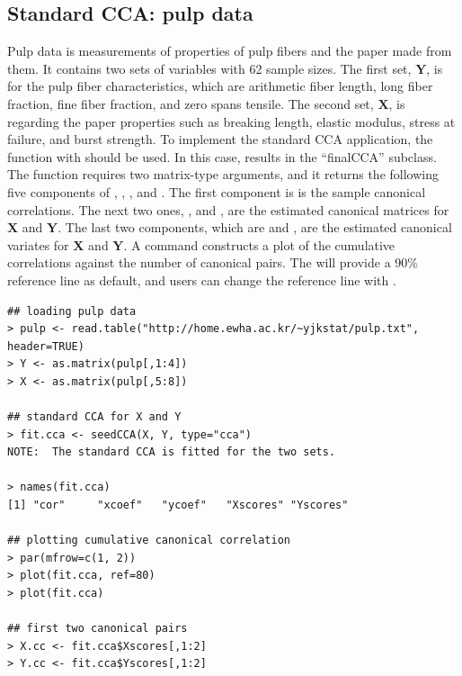\subsection{Standard CCA: pulp data}
Pulp data is measurements of properties of
pulp fibers and the paper made from them.
It contains two sets of variables with 62 sample sizes.
The first set, $\mathbf{Y}$, is for the pulp fiber characteristics,
which are arithmetic fiber length, long fiber fraction,
fine fiber fraction, and zero spans tensile.
The second set, $\mathbf{X}$, is regarding the paper properties such as
breaking length, elastic modulus, stress at failure, and burst strength.
To implement the standard CCA application,
the function   with  should be used.
In this case,  results in the ``finalCCA'' subclass.
The function requires two matrix-type arguments, and
it returns the following five components of
, , ,  and .
The first component is  is the sample canonical correlations.
The next two ones, , and , are
the estimated canonical matrices for $\mathbf{X}$ and $\mathbf{Y}$.
The last two components, which are  and ,
are the estimated canonical variates for $\mathbf{X}$ and $\mathbf{Y}$.
A command   constructs a plot of the cumulative correlations
against the number of canonical pairs.
The  will provide a 90\% reference line as default, and
users can  change the reference line with .
%
\begin{verbatim}
## loading pulp data
> pulp <- read.table("http://home.ewha.ac.kr/~yjkstat/pulp.txt", header=TRUE)
> Y <- as.matrix(pulp[,1:4])
> X <- as.matrix(pulp[,5:8])

## standard CCA for X and Y
> fit.cca <- seedCCA(X, Y, type="cca")
NOTE:  The standard CCA is fitted for the two sets.

> names(fit.cca)
[1] "cor"     "xcoef"   "ycoef"   "Xscores" "Yscores"

## plotting cumulative canonical correlation
> par(mfrow=c(1, 2))
> plot(fit.cca, ref=80)
> plot(fit.cca)

## first two canonical pairs
> X.cc <- fit.cca$Xscores[,1:2]
> Y.cc <- fit.cca$Yscores[,1:2]
\end{verbatim}
%
